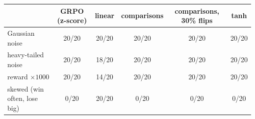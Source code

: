 \begin{tabular}{lccccc}
\toprule
 & GRPO (z-score) & linear & comparisons & comparisons, 30\% flips & tanh \\
\midrule
Gaussian noise & 20/20 & 20/20 & 20/20 & 20/20 & 20/20 \\
heavy-tailed noise & 20/20 & 18/20 & 20/20 & 20/20 & 20/20 \\
reward $\times1000$ & 20/20 & 14/20 & 20/20 & 20/20 & 20/20 \\
skewed (win often, lose big) & 0/20 & 20/20 & 0/20 & 0/20 & 0/20 \\
\bottomrule
\end{tabular}
